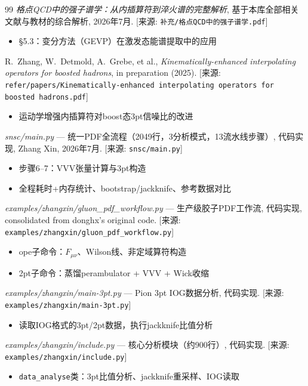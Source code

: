 \documentclass[12pt,a4paper]{ctexart}
\theoremstyle{definition}
\begin{document}
\begin{thebibliography}{99}
\textit{格点QCD中的强子谱学：从内插算符到淬火谱的完整解析},
基于本库全部相关文献与教材的综合解析, 2026年7月.
[来源: \texttt{补充/格点QCD中的强子谱学.pdf}]
\begin{itemize}
    \item §5.3：变分方法（GEVP）在激发态能谱提取中的应用
\end{itemize}

R.~Zhang, W.~Detmold, A.~Grebe, et al.,
\textit{Kinematically-enhanced interpolating operators for boosted hadrons},
in preparation (2025).
[来源: \texttt{refer/papers/Kinematically-enhanced interpolating operators for boosted hadrons.pdf}]
\begin{itemize}
    \item 运动学增强内插算符对boost态3pt信噪比的改进
\end{itemize}

\textit{snsc/main.py} — 统一PDF全流程（2049行，3分析模式，13流水线步骤）,
代码实现, Zhang Xin, 2026年7月.
[来源: \texttt{snsc/main.py}]
\begin{itemize}
    \item 步骤6--7：VVV张量计算与3pt构造
    \item 全程耗时+内存统计、bootstrap/jackknife、参考数据对比
\end{itemize}

\textit{examples/zhangxin/gluon\_pdf\_workflow.py} — 生产级胶子PDF工作流,
代码实现, consolidated from donghx's original code.
[来源: \texttt{examples/zhangxin/gluon\_pdf\_workflow.py}]
\begin{itemize}
    \item ope子命令：$F_{\mu\nu}$、Wilson线、非定域算符构造
    \item 2pt子命令：蒸馏perambulator + VVV + Wick收缩
\end{itemize}

\textit{examples/zhangxin/main-3pt.py} — Pion 3pt IOG数据分析,
代码实现.
[来源: \texttt{examples/zhangxin/main-3pt.py}]
\begin{itemize}
    \item 读取IOG格式的3pt/2pt数据，执行jackknife比值分析
\end{itemize}

\textit{examples/zhangxin/include.py} — 核心分析模块（约900行）,
代码实现.
[来源: \texttt{examples/zhangxin/include.py}]
\begin{itemize}
    \item \texttt{data\_analyse}类：3pt比值分析、jackknife重采样、IOG读取
\end{itemize}

\end{thebibliography}
\end{document}
